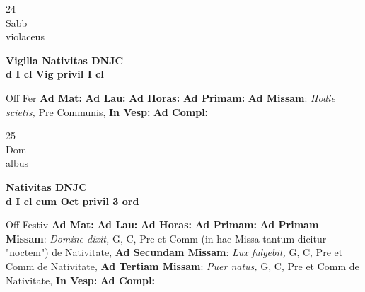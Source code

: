 \documentclass[10pt, openany]{book}
\begin{document}
    \begin{center}
        \begin{minipage}{3.5in}
            \vspace{2em}
            \begin{minipage}{0.5in}
                {\Huge 24} \\
                {\normalsize Sabb} \\
                {\normalsize violaceus}
            \end{minipage}
            \begin{minipage}{3.0in}
                \textbf{ \large Vigilia Nativitas DNJC \\
                \textnormal{\normalsize d I cl Vig privil I cl}} \\ 
            \end{minipage}
            \begin{justify}Off Fer
                \textbf{Ad Mat: }
                \textbf{Ad Lau: }
                \textbf{Ad Horas: }
                \textbf{Ad Primam: }\textbf{Ad Missam}: \textit{Hodie scietis,} Pre Communis,  
                \textbf{In Vesp: }
                \textbf{Ad Compl: }
            \end{justify}
        \end{minipage}
    \end{center}

    \begin{center}
        \begin{minipage}{3.5in}
            \vspace{2em}
            \begin{minipage}{0.5in}
                {\Huge 25} \\
                {\normalsize Dom} \\
                {\normalsize albus}
            \end{minipage}
            \begin{minipage}{3.0in}
                \textbf{ \large Nativitas DNJC \\
                \textnormal{\normalsize d I cl cum Oct privil 3 ord}} \\ 
            \end{minipage}
            \begin{justify}Off Festiv
                \textbf{Ad Mat: }
                \textbf{Ad Lau: }
                \textbf{Ad Horas: }
                \textbf{Ad Primam: }\textbf{Ad Primam Missam}: \textit{Domine dixit,} G, C, Pre et Comm (in hac Missa tantum dicitur "noctem") de Nativitate,  \textbf{Ad Secundam Missam}: \textit{Lux fulgebit,} G, C, Pre et Comm de Nativitate,  \textbf{Ad Tertiam Missam}: \textit{Puer natus,} G, C, Pre et Comm de Nativitate,  
                \textbf{In Vesp: }
                \textbf{Ad Compl: }
            \end{justify}
        \end{minipage}
    \end{center}
\end{document}

